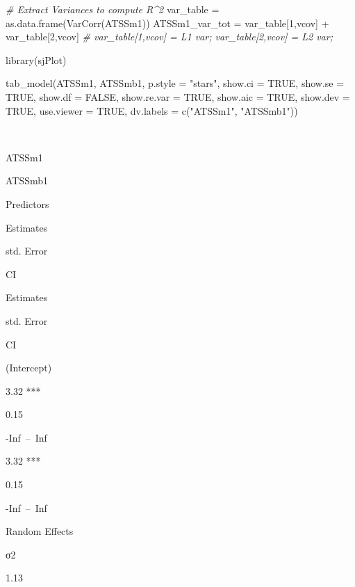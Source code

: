 \documentclass[
  english,
]{book}
\newenvironment{Shaded}{\begin{snugshade}}{\end{snugshade}}
\newcommand{\AttributeTok}[1]{\textcolor[rgb]{0.77,0.63,0.00}{#1}}
\newcommand{\CommentTok}[1]{\textcolor[rgb]{0.56,0.35,0.01}{\textit{#1}}}
\newcommand{\ConstantTok}[1]{\textcolor[rgb]{0.00,0.00,0.00}{#1}}
\newcommand{\DecValTok}[1]{\textcolor[rgb]{0.00,0.00,0.81}{#1}}
\newcommand{\FunctionTok}[1]{\textcolor[rgb]{0.00,0.00,0.00}{#1}}
\newcommand{\NormalTok}[1]{#1}
\newcommand{\OtherTok}[1]{\textcolor[rgb]{0.56,0.35,0.01}{#1}}
\newcommand{\SpecialCharTok}[1]{\textcolor[rgb]{0.00,0.00,0.00}{#1}}
\newcommand{\StringTok}[1]{\textcolor[rgb]{0.31,0.60,0.02}{#1}}
\begin{document}
\begin{Shaded}
\begin{Highlighting}[]
\CommentTok{\# Extract Variances to compute R\^{}2}
\NormalTok{  var\_table }\OtherTok{=} \FunctionTok{as.data.frame}\NormalTok{(}\FunctionTok{VarCorr}\NormalTok{(ATSSm1))}
\NormalTok{  ATSSm1\_var\_tot }\OtherTok{=}\NormalTok{ var\_table[}\DecValTok{1}\NormalTok{,}\StringTok{\textquotesingle{}vcov\textquotesingle{}}\NormalTok{] }\SpecialCharTok{+}\NormalTok{ var\_table[}\DecValTok{2}\NormalTok{,}\StringTok{\textquotesingle{}vcov\textquotesingle{}}\NormalTok{] }\CommentTok{\# var\_table[1,\textquotesingle{}vcov\textquotesingle{}] = L1 var; var\_table[2,\textquotesingle{}vcov\textquotesingle{}] = L2 var;  }

\FunctionTok{library}\NormalTok{(sjPlot)}

\FunctionTok{tab\_model}\NormalTok{(ATSSm1, ATSSmb1, }\AttributeTok{p.style =} \StringTok{"stars"}\NormalTok{, }\AttributeTok{show.ci =} \ConstantTok{TRUE}\NormalTok{, }\AttributeTok{show.se =} \ConstantTok{TRUE}\NormalTok{, }\AttributeTok{show.df =} \ConstantTok{FALSE}\NormalTok{, }\AttributeTok{show.re.var =} \ConstantTok{TRUE}\NormalTok{, }\AttributeTok{show.aic =} \ConstantTok{TRUE}\NormalTok{, }\AttributeTok{show.dev =} \ConstantTok{TRUE}\NormalTok{, }\AttributeTok{use.viewer =} \ConstantTok{TRUE}\NormalTok{, }\AttributeTok{dv.labels =} \FunctionTok{c}\NormalTok{(}\StringTok{"ATSSm1"}\NormalTok{, }\StringTok{"ATSSmb1"}\NormalTok{))}
\end{Highlighting}
\end{Shaded}

~

ATSSm1

ATSSmb1

Predictors

Estimates

std. Error

CI

Estimates

std. Error

CI

(Intercept)

3.32 ***

0.15

-Inf~--~Inf

3.32 ***

0.15

-Inf~--~Inf

Random Effects

σ2

1.13
\end{document}
